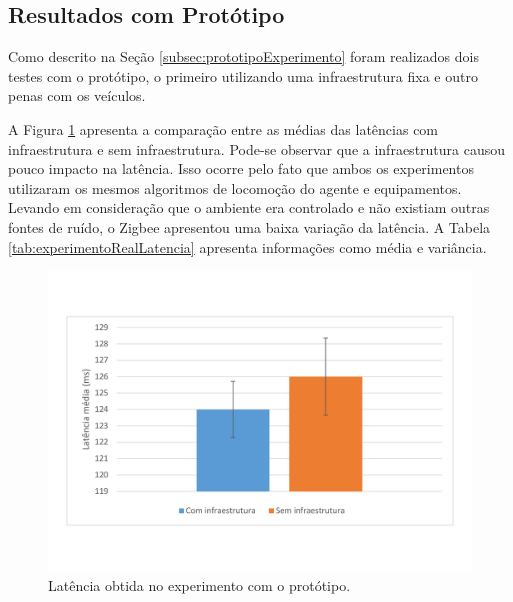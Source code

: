 \subsection{Resultados com Protótipo}

Como descrito na Seção \ref{subsec:prototipoExperimento} foram realizados dois testes com o protótipo, o primeiro utilizando uma infraestrutura fixa e outro penas com os veículos.


A Figura \ref{fig:experimentoRealLatencia} apresenta a comparação entre as médias das latências com infraestrutura e sem infraestrutura. Pode-se observar que a infraestrutura causou pouco impacto na latência. Isso ocorre pelo fato que ambos os experimentos utilizaram os mesmos algoritmos de locomoção do agente e equipamentos. Levando em consideração que o ambiente era controlado e não existiam outras fontes de ruído, o Zigbee apresentou uma baixa variação da latência. A Tabela \ref{tab:experimentoRealLatencia} apresenta informações como média e variância. 

\begin{figure}[htbp]
	\centering
	\includegraphics[scale=0.4]{resultados/graficos/experimentoRealLatencia.pdf}
	\caption{Latência obtida no experimento com o protótipo.}
	\label{fig:experimentoRealLatencia}
\end{figure}


